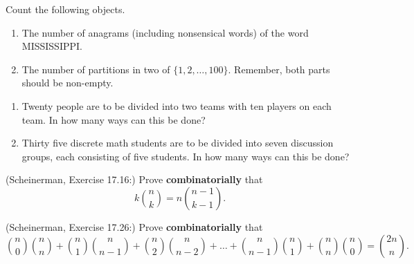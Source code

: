 \documentclass{article}
\theoremstyle{definition}
\begin{document}
\begin{question}
    Count the following objects.
    	\begin{enumerate}
    	\item The number of anagrams (including nonsensical words) of the word MISSISSIPPI.
   	 \item The number of partitions in two of $\{1, 2, \dots, 100 \}$. Remember, both parts should be non-empty.
   	\end{enumerate}
\end{question}
\begin{solution}
\end{solution}




\begin{question}
    \begin{enumerate}
        \item Twenty people are to be divided into two teams with ten players on each team.  In how many ways can this be 	
        done?
        \item Thirty five discrete math students are to be divided into seven discussion groups, each consisting of five students.  
        In how many ways can this be done?
    \end{enumerate}
\end{question}
\begin{solution}
\end{solution}


\begin{question}
    (Scheinerman, Exercise 17.16:)
    Prove \textbf{combinatorially} that
    \[ k {n \choose k}  = n {n-1 \choose k-1}. \]
\end{question}
\begin{solution}
\end{solution}


\begin{question}
    (Scheinerman, Exercise 17.26:)
    Prove \textbf{combinatorially} that
    \[ {n \choose 0}{n \choose n} + {n \choose 1} {n \choose n-1} + {n \choose 2}{n \choose n-2} + \ldots + {n\choose n-1}{n\choose 1} + {n \choose n}{n\choose 0} = {2n \choose n}. \]
\end{question}
\begin{solution}
\end{solution}
\end{document}
